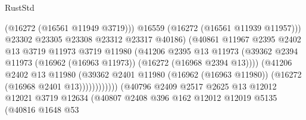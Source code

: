 \begin{lexlean}{RustStd}
\begin{coremodule}
                                              (@16272 (@16561 @11949 @3719)))
                                            @16559
                                            (@16272 (@16561 @11939 @11957)))
                                          @23302
                                          @23305
                                          @23308
                                          @23312
                                          @23317
                                          @40186)
                                        (@40861
                                          @11967
                                          @2395
                                          @2402
                                          @13
                                          @3719
                                          @11973
                                          @3719
                                          @11980
                                          (@41206
                                            @2395
                                            @13
                                            @11973
                                            (@39362
                                              @2394
                                              @11973
                                              (@16962 (@16963 @11973))
                                              (@16272 (@16968 @2394 @13))))
                                          (@41206
                                            @2402
                                            @13
                                            @11980
                                            (@39362
                                              @2401
                                              @11980
                                              (@16962 (@16963 @11980))
                                              (@16272 (@16968 @2401 @13))))))))))))
                          (@40796
                            @2409
                            @2517
                            @2625
                            @13
                            @12012
                            @12021
                            @3719
                            @12634
                            (@40807
                              @2408
                              @396
                              @162
                              @12012
                              @12019
                              @5135
                              (@40816
                                @1648
                                @53

\end{coremodule}
\end{lexlean}
